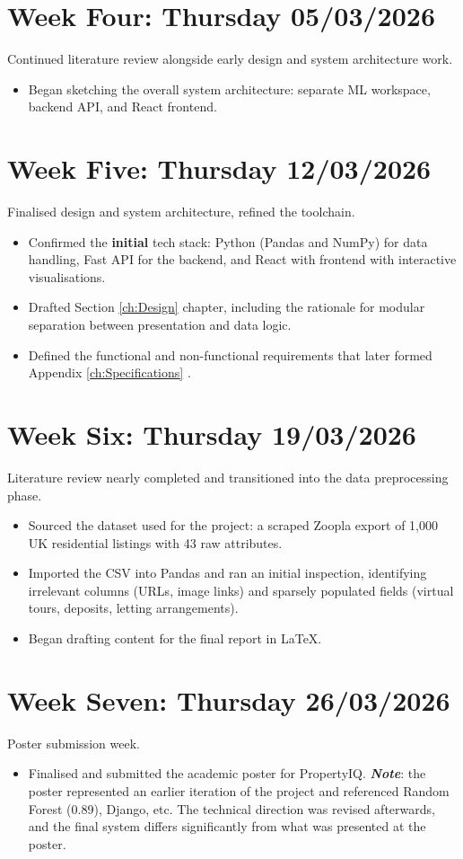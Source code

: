 \section*{Week Four: Thursday 05/03/2026}
Continued literature review alongside early design and system architecture work.
\begin{itemize}
    \item Began sketching the overall system architecture: separate ML workspace, backend API, and React frontend.
\end{itemize}

\section*{Week Five: Thursday 12/03/2026}
Finalised design and system architecture, refined the toolchain.
\begin{itemize}
    \item Confirmed the \textbf{initial} tech stack: Python (Pandas and NumPy) for data handling, Fast API for the backend, and React with frontend with interactive visualisations.
    \item Drafted Section \ref{ch:Design}  chapter, including the rationale for modular separation between presentation and data logic.
    \item Defined the functional and non-functional requirements that later formed Appendix \ref{ch:Specifications} .
\end{itemize}

\section*{Week Six: Thursday 19/03/2026}
Literature review nearly completed and transitioned into the data preprocessing phase.
\begin{itemize}
    \item Sourced the dataset used for the project: a scraped Zoopla export of 1,000 UK residential listings with 43 raw attributes.
    \item Imported the CSV into Pandas and ran an initial inspection, identifying irrelevant columns (URLs, image links) and sparsely populated fields (virtual tours, deposits, letting arrangements).
    \item Began drafting content for the final report in \LaTeX.
\end{itemize}

\section*{Week Seven: Thursday 26/03/2026}
Poster submission week.
\begin{itemize}
    \item Finalised and submitted the academic poster for PropertyIQ.
    \newline \textbf{\textit{Note}}: the poster represented an earlier iteration of the project and referenced Random Forest (0.89), Django, etc. The technical direction was revised afterwards, and the final system differs significantly from what was presented at the poster.
\end{itemize}

